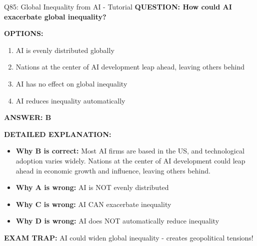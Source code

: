 \documentclass[8pt]{beamer}
\begin{document}
	\begin{frame}{Q85: Global Inequality from AI - Tutorial}
		\fontsize{6.5}{7.5}\selectfont
		\textbf{QUESTION: How could AI exacerbate global inequality?}
		
		\vspace{0.1cm}
		\textbf{OPTIONS:}
		\begin{enumerate}
			\item AI is evenly distributed globally
			\item Nations at the center of AI development leap ahead, leaving others behind
			\item AI has no effect on global inequality
			\item AI reduces inequality automatically
		\end{enumerate}
		
		\vspace{0.1cm}
		\textcolor{myblue}{\textbf{ANSWER: B}}
		
		\vspace{0.1cm}
		\textbf{DETAILED EXPLANATION:}
		\begin{itemize}
			\item \textbf{Why B is correct:} Most AI firms are based in the US, and technological adoption varies widely. Nations at the center of AI development could leap ahead in economic growth and influence, leaving others behind.
			\item \textbf{Why A is wrong:} AI is NOT evenly distributed
			\item \textbf{Why C is wrong:} AI CAN exacerbate inequality
			\item \textbf{Why D is wrong:} AI does NOT automatically reduce inequality
		\end{itemize}
		
		\textcolor{myred}{\textbf{EXAM TRAP:}} AI could \textcolor{myblue}{widen global inequality} - creates geopolitical tensions!
	\end{frame}
	
	
\end{document}
